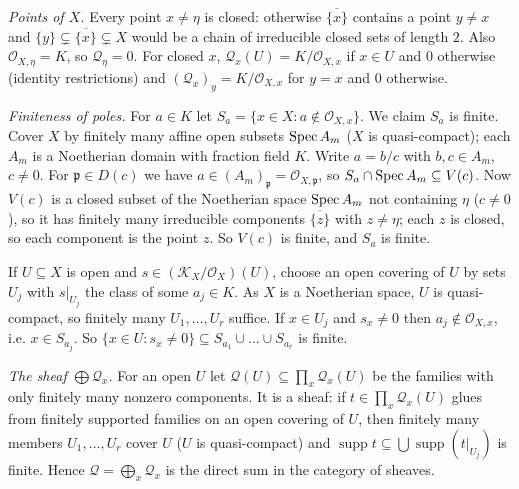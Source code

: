 \documentclass[11pt]{article}
\begin{document}
\emph{Points of $X$.} Every point $x\ne\eta$ is closed: otherwise $\overline{\{x\}}$ contains a point $y\ne x$ and $\{y\}\subsetneq\overline{\{x\}}\subsetneq X$ would be a chain of irreducible closed sets of length $2$. Also $\mathcal O_{X,\eta}=K$, so $\mathcal Q_\eta=0$. For closed $x$, $\mathcal Q_x(U)=K/\mathcal O_{X,x}$ if $x\in U$ and $0$ otherwise (identity restrictions) and $(\mathcal Q_x)_y=K/\mathcal O_{X,x}$ for $y=x$ and $0$ otherwise.

\emph{Finiteness of poles.} For $a\in K$ let $S_a=\{x\in X:a\notin\mathcal O_{X,x}\}$. We claim $S_a$ is finite. Cover $X$ by finitely many affine open subsets $\operatorname{Spec} A_m$ ($X$ is quasi-compact); each $A_m$ is a Noetherian domain with fraction field $K$. Write $a=b/c$ with $b,c\in A_m$, $c\ne0$. For $\mathfrak p\in D(c)$ we have $a\in(A_m)_{\mathfrak p}=\mathcal O_{X,\mathfrak p}$, so $S_a\cap\operatorname{Spec} A_m\subseteq V(c)$. Now $V(c)$ is a closed subset of the Noetherian space $\operatorname{Spec} A_m$ not containing $\eta$ ($c\ne0$), so it has finitely many irreducible components $\overline{\{z\}}$ with $z\ne\eta$; each $z$ is closed, so each component is the point $z$. So $V(c)$ is finite, and $S_a$ is finite.

If $U\subseteq X$ is open and $s\in(\mathcal K_X/\mathcal O_X)(U)$, choose an open covering of $U$ by sets $U_j$ with $s|_{U_j}$ the class of some $a_j\in K$. As $X$ is a Noetherian space, $U$ is quasi-compact, so finitely many $U_1,\dots,U_r$ suffice. If $x\in U_j$ and $s_x\ne0$ then $a_j\notin\mathcal O_{X,x}$, i.e. $x\in S_{a_j}$. So $\{x\in U:s_x\ne0\}\subseteq S_{a_1}\cup\dots\cup S_{a_r}$ is finite.

\emph{The sheaf $\bigoplus\mathcal Q_x$.} For an open $U$ let $\mathcal Q(U)\subseteq\prod_{x}\mathcal Q_x(U)$ be the families with only finitely many nonzero components. It is a sheaf: if $t\in\prod_x\mathcal Q_x(U)$ glues from finitely supported families on an open covering of $U$, then finitely many members $U_1,\dots,U_r$ cover $U$ ($U$ is quasi-compact) and $\operatorname{supp}t\subseteq\bigcup\operatorname{supp}(t|_{U_j})$ is finite. Hence $\mathcal Q=\bigoplus_x\mathcal Q_x$ is the direct sum in the category of sheaves.
\end{document}
